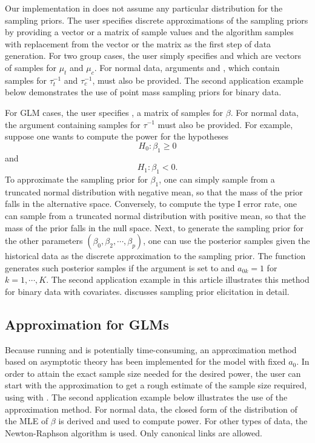 Our implementation in  does not assume any particular distribution for the sampling priors. The user specifies discrete approximations of the sampling priors by providing a vector or a matrix of sample values and the algorithm samples with replacement from the vector or the matrix as the first step of data generation. For two group cases, the user simply specifies  and  which are vectors of samples for $\mu_t$ and $\mu_c$. For normal data, arguments  and , which contain samples for $\tau_t^{-1}$ and $\tau_c^{-1}$, must also be provided. The second application example below demonstrates the use of point mass sampling priors for binary data. 

For GLM cases, the user specifies , a matrix of samples for $\beta$. For normal data, the argument  containing samples for $\tau^{-1}$ must also be provided. For example, suppose one wants to compute the power for the hypotheses $$H_0: \beta_1 \ge 0$$ and $$H_1: \beta_1 < 0.$$ To approximate the sampling prior for $\beta_1$, one can simply sample from a truncated normal distribution with negative mean, so that the mass of the prior falls in the alternative space. Conversely, to compute the type I error rate, one can  sample from a truncated normal distribution with positive mean, so that the mass of the prior falls in the null space. Next, to generate the sampling prior for the other parameters $(\beta_0,\beta_2, \cdots,\beta_p)$, one can use the posterior samples given the historical data as the discrete approximation to the sampling prior. The function  generates such posterior samples if the   argument is set to  and $a_{0k}=1$ for $k=1,\cdots,K.$ The second application example in this article   illustrates this method for binary data with covariates. \cite{psioda_2018} discusses sampling prior elicitation in detail. 


\subsection*{Approximation for GLMs}
Because running  and  is potentially time-consuming, an approximation method based on asymptotic theory  \citep{ibrahim_2015} has been implemented for the model with fixed $a_0$. In order to attain the exact sample size needed for the desired power, the user can start with the approximation to get a rough estimate of the sample size required, using  with . The second application example below illustrates the use of the approximation method. For normal data, the closed form of the distribution of the MLE of $\beta$ is derived and used to compute power. For other types of data, the Newton-Raphson algorithm is used. Only canonical links are allowed. 


